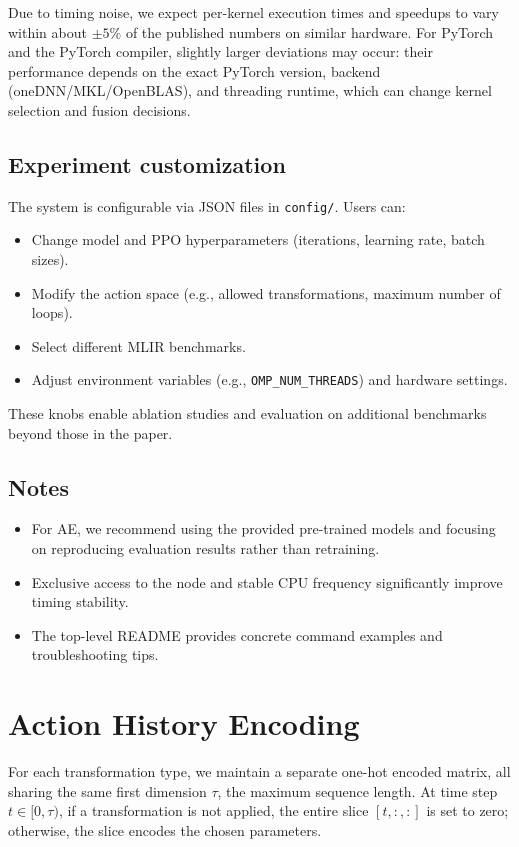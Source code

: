 \documentclass[10pt,twocolumn]{article}
\begin{document}
Due to timing noise, we expect per-kernel execution times and speedups to vary within about $\pm 5\%$ of the published numbers on similar hardware. For PyTorch and the PyTorch compiler, slightly larger deviations may occur: their performance depends on the exact PyTorch version, backend (oneDNN/MKL/OpenBLAS), and threading runtime, which can change kernel selection and fusion decisions.

\subsection{Experiment customization}
The system is configurable via JSON files in \texttt{config/}. Users can:
\begin{itemize}
\item Change model and PPO hyperparameters (iterations, learning rate, batch sizes).
\item Modify the action space (e.g., allowed transformations, maximum number of loops).
\item Select different MLIR benchmarks.
\item Adjust environment variables (e.g., \texttt{OMP\_NUM\_THREADS}) and hardware settings.
\end{itemize}
These knobs enable ablation studies and evaluation on additional benchmarks beyond those in the paper.

\subsection{Notes}
\begin{itemize}
\item For AE, we recommend using the provided pre-trained models and focusing on reproducing evaluation results rather than retraining.
\item Exclusive access to the node and stable CPU frequency significantly improve timing stability.
\item The top-level README provides concrete command examples and troubleshooting tips.
\end{itemize}

\section{Action History Encoding}
\label{app:actionhistory}

For each transformation type, we maintain a separate one-hot encoded matrix, all sharing the same first dimension $\tau$, the maximum sequence length. At time step $t \in [0, \tau)$, if a transformation is not applied, the entire slice $[t, :, :]$ is set to zero; otherwise, the slice encodes the chosen parameters.
\end{document}
